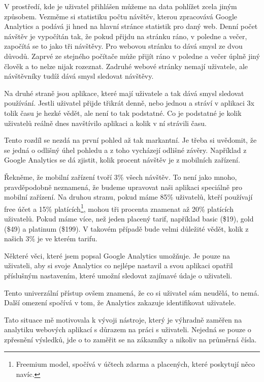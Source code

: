 \documentclass[bc,male,java,dept456]{diploma}						%
\begin{document}
V prostředí, kde je uživatel přihlášen můžeme na data pohlížet zcela jiným způsobem. Vezměme si statistiku počtu návštěv, kterou zpracovává Google Analytics a podává ji hned na hlavní stránce statistik pro daný web. Denní počet návštěv je vypočítán tak, že pokud přijdu na stránku ráno, v poledne a večer, započítá se to jako tři návštěvy. Pro webovou stránku to dává smysl ze dvou důvodů. Zaprvé ze stejného počítače může přijít ráno v poledne a večer úplně jiný člověk a to nelze nijak rozeznat. Zadruhé webové stránky nemají uživatele, ale návštěvníky tudíž dává smysl sledovat návštěvy. 

Na druhé straně jsou aplikace, které mají uživatele a tak dává smysl sledovat používání. Jestli uživatel přijde třikrát denně, nebo jednou a stráví v aplikaci 3x tolik času je hezké vědět, ale není to tak podstatné. Co je podstatné je kolik uživatelů reálně dnes navštívilo aplikaci a kolik v ní strávili času.

Tento rozdíl se nezdá na první pohled až tak markantní. Je třeba si uvědomit, že se jedná o odlišný úhel pohledu a z toho vycházejí odlišné závěry. Například z Google Analytics se dá zjistit, kolik procent návštěv je z mobilních zařízení. 

Řekněme, že mobilní zařízení tvoří 3\% všech návštěv. To není jako mnoho, pra\-vdě\-po\-do\-bně neznamená, že budeme upravovat naši aplikaci speciálně pro mobilní zařízení. Na druhou stranu, pokud máme 85\% uživatelů, kteří používají free účet a 15\% platících\footnote{Freemium model, spočívá v účtech zdarma a placených, které poskytují něco navíc.}, mohou tři procenta znamenat až 20\% platících uživatelů. Pokud máme více, než jeden placený tarif, například basic (\$19), gold (\$49) a platinum (\$199). V takovém případě bude velmi důležité vědět, kolik z našich 3\% je ve kterém tarifu.

Některé věci, které jsem popsal Google Analytics umožňuje. Je pouze na uživateli, aby si svoje Analytics co nejlépe nastavil a svou aplikaci opatřil příslušným nastavením, které umožní sledovat zajímavé údaje o uživateli.

Tento univerzální přístup ovšem znamená, že co si uživatel sám neudělá, to nemá. Další omezení spočívá v tom, že Analytics zakazuje identifikovat uživatele.

Tato situace mě motivovala k vývoji nástroje, který je výhradně zaměřen na analytiku webových aplikací s důrazem na práci s uživateli. Nejedná se pouze o zpřesnění výsledků, jde o to zaměřit se na zákazníky a nikoliv na průměrná čísla.
\end{document}
